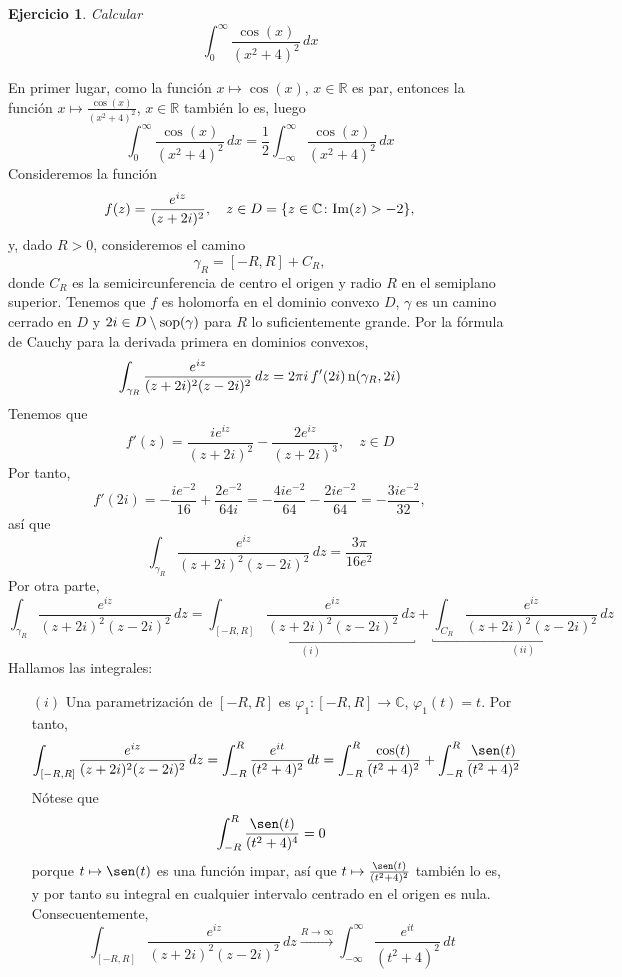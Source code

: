 \documentclass[11pt]{report}
\makeatletter
\renewenvironment{proof}[1][\proofname]{\par
  \pushQED{\qed}%
  \normalfont \topsep\z@skip %
  \trivlist
  \item[\hskip\labelsep
        \itshape
    #1\@addpunct{.}]\ignorespaces
}{%
  \popQED\endtrivlist\@endpefalse
}
\newcommand{\R}{\mathbb R}
\newcommand{\C}{\mathbb C}
\newtheorem{exercise}{Ejercicio}
\makeatother
\begin{document}
\begin{exercise}
Calcular
\[\int_0^\infty \frac{\cos(x)}{(x^2+4)^2} \, dx\]
\end{exercise}

\begin{proof}
En primer lugar, como la función $x \mapsto \cos(x)$, $x \in \R$ es par, entonces la función $x \mapsto \frac{\cos(x)}{(x^2+4)^2}$, $x \in \R$ también lo es, luego
\[\int_0^\infty \frac{\cos(x)}{(x^2+4)^2} \, dx = \frac{1}{2}\int_{-\infty}^\infty\frac{\cos(x)}{(x^2+4)^2} \, dx \]
Consideremos la función
\[f(z) = \frac{e^{iz}}{(z+2i)^2}, \quad z \in D = \{z \in \C \colon \textup{Im}(z) > -2\},\]
y, dado $R > 0$, consideremos el camino
\[\gamma_R = [-R,R] + C_R,\]
donde $C_R$ es la semicircunferencia de centro el origen y radio $R$ en el semiplano superior. Tenemos que $f$ es holomorfa en el dominio convexo $D$, $\gamma$ es un camino cerrado en $D$ y $2i \in D \setminus \textup{sop}(\gamma)$ para $R$ lo suficientemente grande. Por la fórmula de Cauchy para la derivada primera en dominios convexos,
\[\int_{\gamma_R} \frac{e^{iz}}{(z+2i)^2(z-2i)^2} \, dz = 2\pi i \, f'(2i) \, \textup{n}(\gamma_R,2i)\]
Tenemos que
\[f'(z) = \frac{ie^{iz}}{(z+2i)^2}-\frac{2e^{iz}}{(z+2i)^3}, \quad z \in D\]
Por tanto, \[f'(2i) = -\frac{ie^{-2}}{16}+\frac{2e^{-2}}{64i} = -\frac{4ie^{-2}}{64}-\frac{2ie^{-2}}{64} = -\frac{3ie^{-2}}{32},\]
así que
\[\int_{\gamma_R} \frac{e^{iz}}{(z+2i)^2(z-2i)^2} \, dz = \frac{3\pi}{16e^2}\]
Por otra parte,
\[\int_{\gamma_R} \frac{e^{iz}}{(z+2i)^2(z-2i)^2} \, dz = \underbracket{\int_{[-R,R]} \frac{e^{iz}}{(z+2i)^2(z-2i)^2} \, dz}_{(i)}+\underbracket{\int_{C_R} \frac{e^{iz}}{(z+2i)^2(z-2i)^2} \, dz}_{(ii)} \tag{$*$}\]
Hallamos las integrales:
\begin{itemize}
    \item[$(i)$] Una parametrización de $[-R,R]$ es $\varphi_1 \colon [-R,R] \to \C$, $\varphi_1(t) = t$. Por tanto,
    \[\begin{aligned}[t] 
    \int_{[-R,R]} \frac{e^{iz}}{(z+2i)^2(z-2i)^2} \, dz &= \int_{-R}^R \frac{e^{it}}{(t^2+4)^2} \, dt = \int_{-R}^R\frac{\cos(t)}{(t^2+4)^2}+\int_{-R}^R\frac{\sen(t)}{(t^2+4)^2}
    \end{aligned}
    \]
    Nótese que
    \[\int_{-R}^R\frac{\sen(t)}{(t^2+4)^4} = 0\]
    porque $t \mapsto \sen(t)$ es una función impar, así que $t \mapsto \frac{\sen (t)}{(t^2+4)^2}$ también lo es, y por tanto su integral en cualquier intervalo centrado en el origen es nula. Consecuentemente,
    \[\int_{[-R,R]} \frac{e^{iz}}{(z+2i)^2(z-2i)^2} \, dz \xrightarrow[]{R \to \infty}\int_{-\infty}^\infty \frac{e^{it}}{(t^2+4)^2} \, dt  \]

\end{itemize}
\end{proof}
\end{document}
